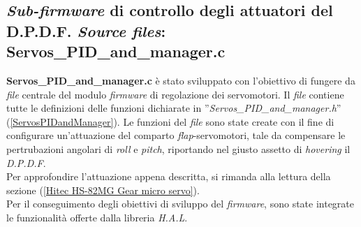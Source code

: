 
\subsection{\textit{Sub-firmware} di controllo degli attuatori del D.P.D.F. \textit{Source files}: Servos\_PID\_and\_manager.c}
\label{ServosPIDandManager_c}
\textbf{Servos\_PID\_and\_manager.c} è stato sviluppato con l'obiettivo di fungere da \textit{file} centrale del modulo \textit{firmware} di regolazione dei servomotori.
Il \textit{file} contiene tutte le definizioni delle funzioni dichiarate in ''\textit{Servos\_PID\_and\_manager.h}'' (\ref{ServosPIDandManager}).
Le funzioni del \textit{file} sono state create con il fine di configurare un'attuazione del comparto \textit{flap}-servomotori, tale da compensare le pertrubazioni angolari di \textit{roll} e \textit{pitch}, riportando nel giusto assetto di \textit{hovering} il \textit{D.P.D.F}.\\
Per approfondire l'attuazione appena descritta, si rimanda alla lettura della sezione (\ref{Hitec HS-82MG Gear micro servo}).\\
Per il conseguimento degli obiettivi di sviluppo del \textit{firmware}, sono state integrate le funzionalità offerte dalla libreria \textit{H.A.L}.

